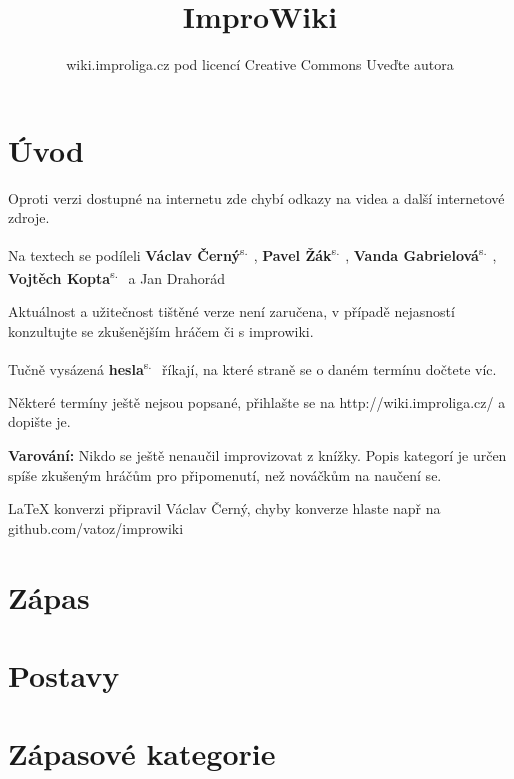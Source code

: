 \documentclass[a4paper,10pt,openany]{book}
\title{ImproWiki}
\author{wiki.improliga.cz pod licencí Creative Commons Uveďte autora}
\newcommand{\odkaz}[2]{\textbf{#1}\textsuperscript{s.~\pageref{#2}}}
\begin{document}
\begin{titlepage}
\maketitle
\end{titlepage}
 
\chapter{Úvod}\label{úvod}

 

Oproti verzi dostupné na internetu zde chybí odkazy na videa a další internetové zdroje.

Na textech se podíleli \odkaz{Václav Černý}{uživatel:vatoz}, \odkaz{Pavel Žák}{uživatel:just-paja}, \odkaz{Vanda Gabrielová}{uživatel:vandagabi}, \odkaz{Vojtěch Kopta}{uživatel:vojtechkopta} a Jan Drahorád

Aktuálnost a užitečnost tištěné verze není zaručena, v případě nejasností konzultujte se zkušenějším hráčem či s improwiki.

Tučně vysázená \odkaz{hesla}{úvod} říkají, na které straně se o daném termínu dočtete víc.

Některé termíny ještě nejsou popsané, přihlašte se na http://wiki.improliga.cz/ a dopište je.

\textbf{Varování:} Nikdo se ještě nenaučil improvizovat z knížky. Popis kategorí je určen spíše zkušeným hráčům pro připomenutí, než nováčkům na naučení se.  

\LaTeX{} konverzi připravil  Václav Černý, chyby konverze hlaste např na github.com/vatoz/improwiki
\chapter{Zápas}







\chapter{Postavy}



\chapter{Zápasové kategorie}
\label{zápasové kategorie}
\label{:kategorie:zápasové kategorie}


\end{document}
